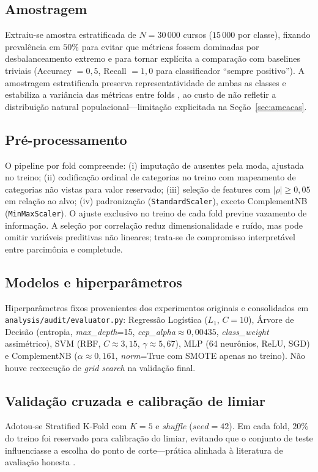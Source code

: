 \documentclass[conference]{IEEEtran}
\begin{document}
\subsection{Amostragem}
Extraiu-se amostra estratificada de $N = 30\,000$ cursos ($15\,000$ por classe), fixando prevalência em $50\%$ para evitar que métricas fossem dominadas por desbalanceamento extremo e para tornar explícita a comparação com baselines triviais (Accuracy $= 0{,}5$, Recall $= 1{,}0$ para classificador ``sempre positivo''). A amostragem estratificada preserva representatividade de ambas as classes e estabiliza a variância das métricas entre folds \cite{kohavi1995}, ao custo de não refletir a distribuição natural populacional---limitação explicitada na Seção~\ref{sec:ameacas}.

\subsection{Pré-processamento}
O pipeline por fold compreende: (i) imputação de ausentes pela moda, ajustada no treino; (ii) codificação ordinal de categorias no treino com mapeamento de categorias não vistas para valor reservado; (iii) seleção de features com $|\rho| \geq 0{,}05$ em relação ao alvo; (iv) padronização (\texttt{StandardScaler}), exceto ComplementNB (\texttt{MinMaxScaler}). O ajuste exclusivo no treino de cada fold previne vazamento de informação. A seleção por correlação reduz dimensionalidade e ruído, mas pode omitir variáveis preditivas não lineares; trata-se de compromisso interpretável entre parcimônia e completude.

\subsection{Modelos e hiperparâmetros}
Hiperparâmetros fixos provenientes dos experimentos originais e consolidados em \texttt{analysis/audit/evaluator.py}: Regressão Logística ($L_1$, $C=10$), Árvore de Decisão (entropia, \textit{max\_depth}=15, \textit{ccp\_alpha}$\approx 0{,}00435$, \textit{class\_weight} assimétrico), SVM (RBF, $C \approx 3{,}15$, $\gamma \approx 5{,}67$), MLP (64 neurônios, ReLU, SGD) e ComplementNB ($\alpha \approx 0{,}161$, \textit{norm}=True com SMOTE apenas no treino). Não houve reexecução de \textit{grid search} na validação final.

\subsection{Validação cruzada e calibração de limiar}
Adotou-se Stratified K-Fold com $K=5$ e \textit{shuffle} ($seed=42$). Em cada fold, $20\%$ do treino foi reservado para calibração do limiar, evitando que o conjunto de teste influenciasse a escolha do ponto de corte---prática alinhada à literatura de avaliação honesta \cite{kohavi1995}.
\end{document}
